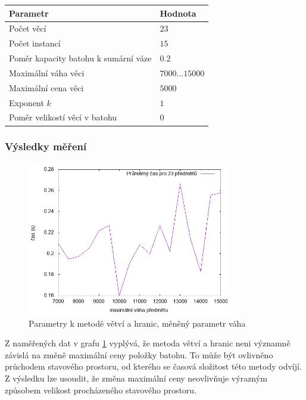 \documentclass{article}
\begin{document}
\begin{table}[H]
\centering
    \begin{tabular}{ |l|l| } 
        \hline
        Parametr & Hodnota \\
        \hline
        \hline
        Počet věcí & $23$ \\
        Počet instancí & $15$ \\
        Poměr kapacity batohu k sumární váze & 0.2 \\
        Maximální váha věci & $7000 \dots 15000$ \\
        Maximální cena věci & $5000$ \\
        Exponent $k$ & $1$ \\
        Poměr velikostí věcí v batohu & $0$ \\
        \hline
    \end{tabular}
\end{table}

\subsubsection*{Výsledky měření}

\begin{figure}[H]
    \centering
    \includegraphics[width=0.8\textwidth]{inputs-bb-weight/inputs-bb-weight.png}
    \caption{Parametry k metodě větví a hranic, měněný parametr váha}
    \label{fig:g1}
\end{figure}

Z naměřených dat v grafu \ref{fig:g1} vyplývá, že metoda větví a hranic neni významně závislá na změně maximální ceny položky batohu.
To může být ovlivněno průchodem stavového prostoru, od kterého se časová složitost této metody odvíjí.
Z výsledku lze usoudit, že změna maximální ceny neovlivňuje výrazným způsobem velikost procházeného stavového prostoru.
\end{document}
